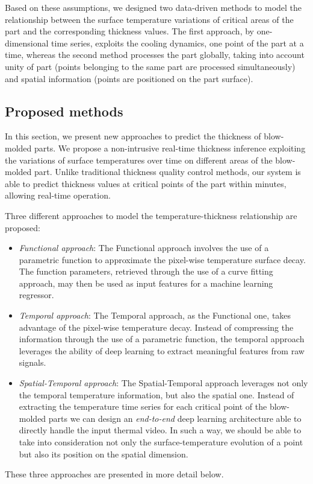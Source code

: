 Based on these assumptions, we designed two data-driven methods to model the relationship between the surface temperature variations of critical areas of the part and the corresponding thickness values. The first approach, by one-dimensional time series, exploits the cooling dynamics, one point of the part at a time, whereas the second method processes the part globally, taking into account unity of part (points belonging to the same part are processed simultaneously) and spatial information (points are positioned on the part surface).

\subsection{Proposed methods}

In this section, we present new approaches to predict the thickness of blow-molded parts. We propose a non-intrusive real-time thickness inference exploiting the variations of surface temperatures over time on different areas of the blow-molded part. 
Unlike traditional thickness quality control methods, our system is able to predict thickness values at critical points of the part within minutes, allowing real-time operation.

Three different approaches to model the temperature-thickness relationship are proposed:
%
\begin{itemize}
    \item \textit{Functional approach}: The Functional approach involves the use of a parametric function to approximate the pixel-wise temperature surface decay. The function parameters, retrieved through the use of a curve fitting approach, may then be used as input features for a machine learning regressor.
    \item \textit{Temporal approach}: The Temporal approach, as the Functional one, takes advantage of the pixel-wise temperature decay. Instead of compressing the information through the use of a parametric function, the temporal approach leverages the ability of deep learning to extract meaningful features from raw signals.
    \item \textit{Spatial-Temporal approach}: The Spatial-Temporal approach leverages not only the temporal temperature information, but also the spatial one. Instead of extracting the temperature time series for each critical point of the blow-molded parts we can design an \textit{end-to-end} deep learning architecture able to directly handle the input thermal video. In such a way, we should be able to take into consideration not only the surface-temperature evolution of a point but also its position on the spatial dimension. 
\end{itemize}
%
These three approaches are presented in more detail below.

